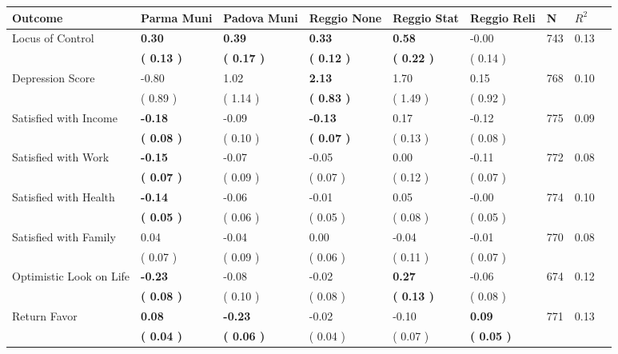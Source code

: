\begin{tabular}{L{6.2cm} C{1.8cm} C{1.8cm} C{1.8cm} C{1.8cm} C{1.8cm} C{1.8cm} C{0.3cm} C{0.3cm}}
\toprule
 \textbf{Outcome} & \textbf{Parma Muni} & \textbf{Padova Muni} & \textbf{Reggio None} & \textbf{Reggio Stat} & \textbf{Reggio Reli} & \textbf{N} & \textbf{$ R^2$} \\
\midrule
Locus of Control & \textbf{     0.30} & \textbf{     0.39} & \textbf{     0.33} & \textbf{     0.58} &     -0.00  & 743 &       0.13 \\ 
 & \textbf{(     0.13 )} & \textbf{(     0.17 )} & \textbf{(     0.12 )} & \textbf{(     0.22 )} & (     0.14 )  & \\
Depression Score &     -0.80 &      1.02 & \textbf{     2.13} &      1.70 &      0.15  & 768 &       0.10 \\ 
 & (     0.89 ) & (     1.14 ) & \textbf{(     0.83 )} & (     1.49 ) & (     0.92 )  & \\
Satisfied with Income & \textbf{    -0.18} &     -0.09 & \textbf{    -0.13} &      0.17 &     -0.12  & 775 &       0.09 \\ 
 & \textbf{(     0.08 )} & (     0.10 ) & \textbf{(     0.07 )} & (     0.13 ) & (     0.08 )  & \\
Satisfied with Work & \textbf{    -0.15} &     -0.07 &     -0.05 &      0.00 &     -0.11  & 772 &       0.08 \\ 
 & \textbf{(     0.07 )} & (     0.09 ) & (     0.07 ) & (     0.12 ) & (     0.07 )  & \\
Satisfied with Health & \textbf{    -0.14} &     -0.06 &     -0.01 &      0.05 &     -0.00  & 774 &       0.10 \\ 
 & \textbf{(     0.05 )} & (     0.06 ) & (     0.05 ) & (     0.08 ) & (     0.05 )  & \\
Satisfied with Family &      0.04 &     -0.04 &      0.00 &     -0.04 &     -0.01  & 770 &       0.08 \\ 
 & (     0.07 ) & (     0.09 ) & (     0.06 ) & (     0.11 ) & (     0.07 )  & \\
Optimistic Look on Life & \textbf{    -0.23} &     -0.08 &     -0.02 & \textbf{     0.27} &     -0.06  & 674 &       0.12 \\ 
 & \textbf{(     0.08 )} & (     0.10 ) & (     0.08 ) & \textbf{(     0.13 )} & (     0.08 )  & \\
Return Favor & \textbf{     0.08} & \textbf{    -0.23} &     -0.02 &     -0.10 & \textbf{     0.09}  & 771 &       0.13 \\ 
 & \textbf{(     0.04 )} & \textbf{(     0.06 )} & (     0.04 ) & (     0.07 ) & \textbf{(     0.05 )}  & \\

\end{tabular}
